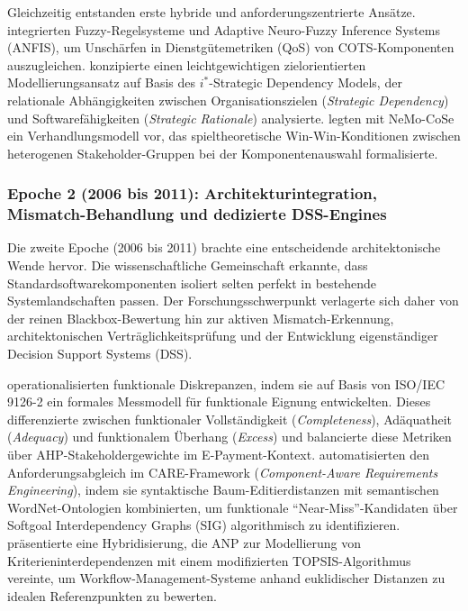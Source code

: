 Gleichzeitig entstanden erste hybride und anforderungszentrierte Ansätze. \textcite{CI86GRRG} integrierten Fuzzy-Regelsysteme und Adaptive Neuro-Fuzzy Inference Systems (ANFIS), um Unschärfen in Dienstgütemetriken (QoS) von COTS-Komponenten auszugleichen. \textcite{TLB687YL} konzipierte einen leichtgewichtigen zielorientierten Modellierungsansatz auf Basis des $i^*$-Strategic Dependency Models, der relationale Abhängigkeiten zwischen Organisationszielen (\textit{Strategic Dependency}) und Softwarefähigkeiten (\textit{Strategic Rationale}) analysierte. \textcite{CZZ6XQZJ} legten mit NeMo-CoSe ein Verhandlungsmodell vor, das spieltheoretische Win-Win-Konditionen zwischen heterogenen Stakeholder-Gruppen bei der Komponentenauswahl formalisierte.

\subsubsection{Epoche 2 (2006 bis 2011): Architekturintegration, Mismatch-Behandlung und dedizierte DSS-Engines}
\label{subsubsec:epoche2}

Die zweite Epoche (2006 bis 2011) brachte eine entscheidende architektonische Wende hervor. Die wissenschaftliche Gemeinschaft erkannte, dass Standardsoftwarekomponenten isoliert selten perfekt in bestehende Systemlandschaften passen. Der Forschungsschwerpunkt verlagerte sich daher von der reinen Blackbox-Bewertung hin zur aktiven Mismatch-Erkennung, architektonischen Verträglichkeitsprüfung und der Entwicklung eigenständiger Decision Support Systems (DSS).

\textcite{8XNYS4M9} operationalisierten funktionale Diskrepanzen, indem sie auf Basis von ISO/IEC 9126-2 ein formales Messmodell für funktionale Eignung entwickelten. Dieses differenzierte zwischen funktionaler Vollständigkeit (\textit{Completeness}), Adäquatheit (\textit{Adequacy}) und funktionalem Überhang (\textit{Excess}) und balancierte diese Metriken über AHP-Stakeholdergewichte im E-Payment-Kontext. \textcite{6RNULWVY} automatisierten den Anforderungsabgleich im CARE-Framework (\textit{Component-Aware Requirements Engineering}), indem sie syntaktische Baum-Editierdistanzen mit semantischen WordNet-Ontologien kombinierten, um funktionale \enquote{Near-Miss}-Kandidaten über Softgoal Interdependency Graphs (SIG) algorithmisch zu identifizieren. \textcite{U5JPV4SF} präsentierte eine Hybridisierung, die ANP zur Modellierung von Kriterieninterdependenzen mit einem modifizierten TOPSIS-Algorithmus vereinte, um Workflow-Management-Systeme anhand euklidischer Distanzen zu idealen Referenzpunkten zu bewerten.

